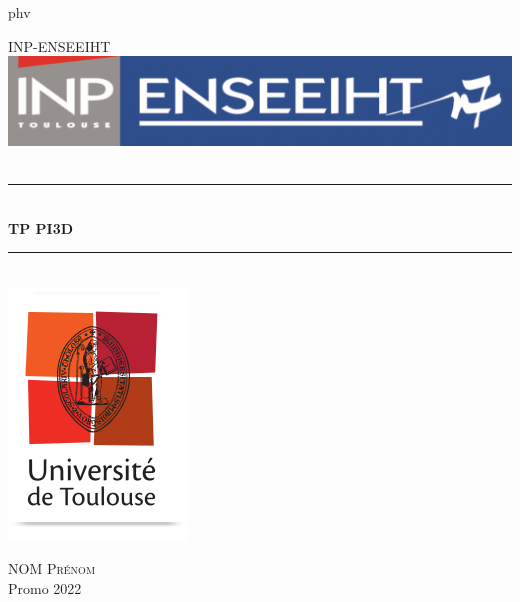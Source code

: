 \documentclass{article}
\newcommand{\HRule}{\rule{\linewidth}{0.5mm}}
\begin{document}
\begin{fontfamily}{phv}
\begin{selectfont}
\begin{titlepage}
  \begin{sffamily}
  \begin{center}

    \textsc{\LARGE INP-ENSEEIHT}\\[2cm]
    
    \includegraphics[scale=0.50]{pagedegarde/Title.png}~\\[1.5cm]

    \HRule \\[0.4cm]
        { \huge \bfseries TP PI3D \\[0.4cm] }

    \HRule \\[2cm]
    \includegraphics[scale=0.3]{pagedegarde/logouniv.png}
    \\[2cm]

    \begin{minipage}{0.4\textwidth}
      \begin{flushleft} \large
        NOM \textsc{Prénom}\\
        
        Promo 2022\\
      \end{flushleft}
    \end{minipage}
    \begin{minipage}{0.4\textwidth}
      \begin{flushright} \large
       

\end{flushright}
\end{minipage}
\end{center}
\end{sffamily}
\end{titlepage}
\end{selectfont}
\end{fontfamily}
\end{document}
